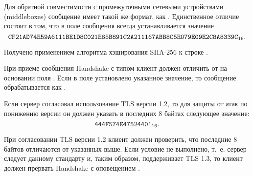 Для обратной совместимости с промежуточными сетевыми устройствами (middleboxes)
сообщение  имеет такой же формат, как 
. Единственное отличие состоит в том, что в поле 
сообщения  всегда устанавливается значение
$$
\texttt{CF21AD74E59A6111BE1D8C021E65B891C2A211167ABB8C5E079E09E2C8A8339C}_{16}.
$$

\begin{note*}
Получено применением алгоритма хэширования SHA-256 к строке .
\end{note*}

При приеме сообщения Handshake с типом  клиент должен 
отличить  от  на основании 
поля . Если в поле установлено указанное значение, то сообщение 
обрабатывается как .

Если сервер согласовал использование TLS версии 1.2, то для защиты от атак по 
понижению версии он должен указать в последних 8 байтах 
 следующее значение:
$$
\texttt{444F574E47524401}_{16}.
$$



При согласовании TLS версии 1.2 клиент должен проверить, что последние 8 байтов 
 отличаются от указанных выше.
%
Если условие не выполнено, т.~е. сервер следует данному стандарту и, таким образом,
поддерживает TLS 1.3, то клиент должен прервать Handshake с оповещением 
. 




